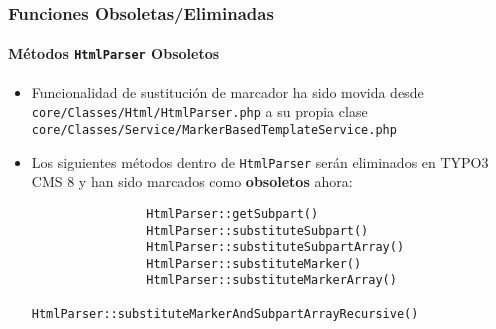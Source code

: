 
\begin{frame}[fragile]
	\frametitle{Funciones Obsoletas/Eliminadas}
	\framesubtitle{Métodos \texttt{HtmlParser} Obsoletos}


	\begin{itemize}

		\item Funcionalidad de sustitución de marcador ha sido movida desde\newline
			\texttt{core/Classes/Html/HtmlParser.php}\newline
			a su propia clase\newline
			\texttt{core/Classes/Service/MarkerBasedTemplateService.php}

		\item Los siguientes métodos dentro de \texttt{HtmlParser} serán eliminados
			en TYPO3 CMS 8 y han sido marcados como \textbf{obsoletos} ahora:

			\begin{lstlisting}
				HtmlParser::getSubpart()
				HtmlParser::substituteSubpart()
				HtmlParser::substituteSubpartArray()
				HtmlParser::substituteMarker()
				HtmlParser::substituteMarkerArray()
				HtmlParser::substituteMarkerAndSubpartArrayRecursive()
			\end{lstlisting}

	\end{itemize}

\end{frame}


